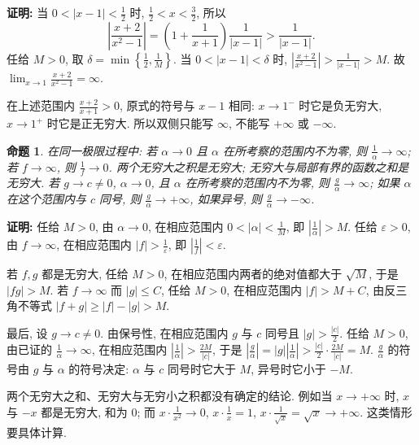 \documentclass[UTF8,openany]{ctexbook}
\theoremstyle{chinesetextbook}
\newtheorem{proposition}{命题}[section]
\newenvironment{cnproof}{\par\indent\textbf{证明:} \ignorespaces}{\par}
\begin{document}
\begin{cnproof}
当 $\displaystyle0<|x-1|<\frac12$ 时, $\displaystyle\frac12<x<\frac32$, 所以
\[
\left|\frac{x+2}{x^2-1}\right|=\left(1+\frac1{x+1}\right)\frac1{|x-1|}>\frac1{|x-1|}.
\]
任给 $M>0$, 取 $\displaystyle\delta=\min\left\{\frac12,\frac1M\right\}$. 当 $0<|x-1|<\delta$ 时, $\displaystyle\left|\frac{x+2}{x^2-1}\right|>\frac1{|x-1|}>M$. 故 $\displaystyle\lim_{x\to1}\frac{x+2}{x^2-1}=\infty$.
\end{cnproof}
在上述范围内 $\displaystyle\frac{x+2}{x+1}>0$, 原式的符号与 $x-1$ 相同: $x\to1^-$ 时它是负无穷大, $x\to1^+$ 时它是正无穷大. 所以双侧只能写 $\infty$, 不能写 $+\infty$ 或 $-\infty$.
\begin{proposition}
在同一极限过程中: 若 $\alpha\to0$ 且 $\alpha$ 在所考察的范围内不为零, 则 $\displaystyle\frac1\alpha\to\infty$; 若 $f\to\infty$, 则 $\displaystyle\frac1f\to0$. 两个无穷大之积是无穷大; 无穷大与局部有界的函数之和是无穷大. 若 $g\to c\ne0$, $\alpha\to0$, 且 $\alpha$ 在所考察的范围内不为零, 则 $\displaystyle\frac g\alpha\to\infty$; 如果 $\alpha$ 在这个范围内与 $c$ 同号, 则 $\displaystyle\frac g\alpha\to+\infty$, 如果异号, 则 $\displaystyle\frac g\alpha\to-\infty$.
\end{proposition}
\begin{cnproof}
任给 $M>0$, 由 $\alpha\to0$, 在相应范围内 $\displaystyle0<|\alpha|<\frac1M$, 即 $\displaystyle\left|\frac1\alpha\right|>M$. 任给 $\varepsilon>0$, 由 $f\to\infty$, 在相应范围内 $\displaystyle|f|>\frac1\varepsilon$, 即 $\displaystyle\left|\frac1f\right|<\varepsilon$.

若 $f,g$ 都是无穷大, 任给 $M>0$, 在相应范围内两者的绝对值都大于 $\sqrt M$, 于是 $|fg|>M$. 若 $f\to\infty$ 而 $|g|\le C$, 任给 $M>0$, 在相应范围内 $|f|>M+C$, 由反三角不等式 $|f+g|\ge|f|-|g|>M$.

最后, 设 $g\to c\ne0$. 由保号性, 在相应范围内 $g$ 与 $c$ 同号且 $\displaystyle|g|>\frac{|c|}2$. 任给 $M>0$, 由已证的 $\displaystyle\frac1\alpha\to\infty$, 在相应范围内 $\displaystyle\left|\frac1\alpha\right|>\frac{2M}{|c|}$, 于是 $\displaystyle\left|\frac g\alpha\right|=|g|\left|\frac1\alpha\right|>\frac{|c|}2\cdot\frac{2M}{|c|}=M$. $\displaystyle\frac g\alpha$ 的符号由 $g$ 与 $\alpha$ 的符号决定: $\alpha$ 与 $c$ 同号时它大于 $M$, 异号时它小于 $-M$.
\end{cnproof}
两个无穷大之和、无穷大与无穷小之积都没有确定的结论. 例如当 $x\to+\infty$ 时, $x$ 与 $-x$ 都是无穷大, 和为 $0$; 而 $\displaystyle x\cdot\frac1{x^2}\to0$, $\displaystyle x\cdot\frac1x=1$, $\displaystyle x\cdot\frac1{\sqrt x}=\sqrt x\to+\infty$. 这类情形要具体计算.
\end{document}
